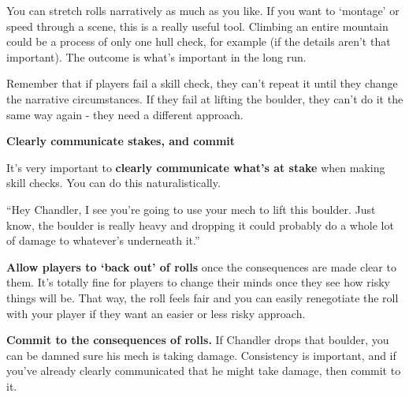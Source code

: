 You can stretch rolls narratively as much as you like. If you want to ‘montage’ or speed through a
scene, this is a really useful tool. Climbing an entire mountain could be a process of only one hull
check, for example (if the details aren’t that important). The outcome is what’s important in the
long run.

Remember that if players fail a skill check, they can’t repeat it until they change the
narrative circumstances. If they fail at lifting the boulder, they can’t do it the same way again -
they need a different approach.

\begin{center}
\textbf{Clearly communicate stakes, and commit}
\end{center}     

It’s very important to \textbf{clearly communicate what’s at stake} when making skill checks. You can
do this naturalistically.

\quad“Hey Chandler, I see you’re going to use your mech to lift this boulder. Just know, the
boulder is really heavy and dropping it could probably do a whole lot of damage to whatever’s
underneath it.”

\textbf{Allow players to ‘back out’ of rolls} once the consequences are made clear to them. It’s totally
fine for players to change their minds once they see how risky things will be. That way, the roll
feels fair and you can easily renegotiate the roll with your player if they want an easier or less
risky approach.

\textbf{Commit to the consequences of rolls.} If Chandler drops that boulder, you can be damned sure
his mech is taking damage. Consistency is important, and if you’ve already clearly
communicated that he might take damage, then commit to it.


